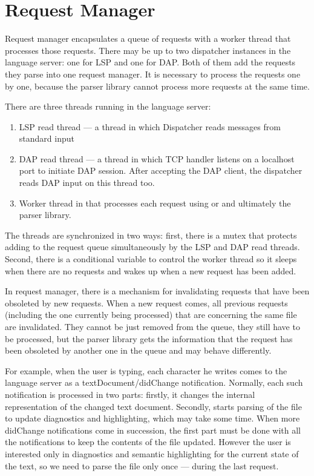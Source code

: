 \section{Request Manager}

Request manager encapsulates a queue of requests with a worker thread that processes those requests. There may be up to two dispatcher instances in the language server: one for LSP and one for DAP. Both of them add the requests they parse into one request manager. It is necessary to process the requests one by one, because the parser library cannot process more requests at the same time.

There are three threads running in the language server:
\begin{enumerate}
	\item LSP read thread --- a thread in which Dispatcher reads messages from standard input
	\item DAP read thread --- a thread in which TCP handler listens on a localhost port to initiate DAP session. After accepting the DAP client, the dispatcher reads DAP input on this thread too.
	\item Worker thread in that processes each request using  or  and ultimately the parser library.
\end{enumerate}

The threads are synchronized in two ways: first, there is a mutex that protects adding to the request queue simultaneously by the LSP and DAP read threads. Second, there is a conditional variable to control the worker thread so it sleeps when there are no requests and wakes up when a new request has been added.

In request manager, there is a mechanism for invalidating requests that have been obsoleted by new requests. When a new request comes, all previous requests (including the one currently being processed) that are concerning the same file are invalidated. They cannot be just removed from the queue, they still have to be processed, but the parser library gets the information that the request has been obsoleted by another one in the queue and may behave differently.

For example, when the user is typing, each character he writes comes to the language server as a textDocument/didChange notification. Normally, each such notification is processed in two parts: firstly, it changes the internal representation of the changed text document. Secondly, starts parsing of the file to update diagnostics and highlighting, which may take some time. When more didChange notifications come in succession, the first part must be done with all the notifications to keep the contents of the file updated. However the user is interested only in diagnostics and semantic highlighting for the current state of the text, so we need to parse the file only once --- during the last request.


